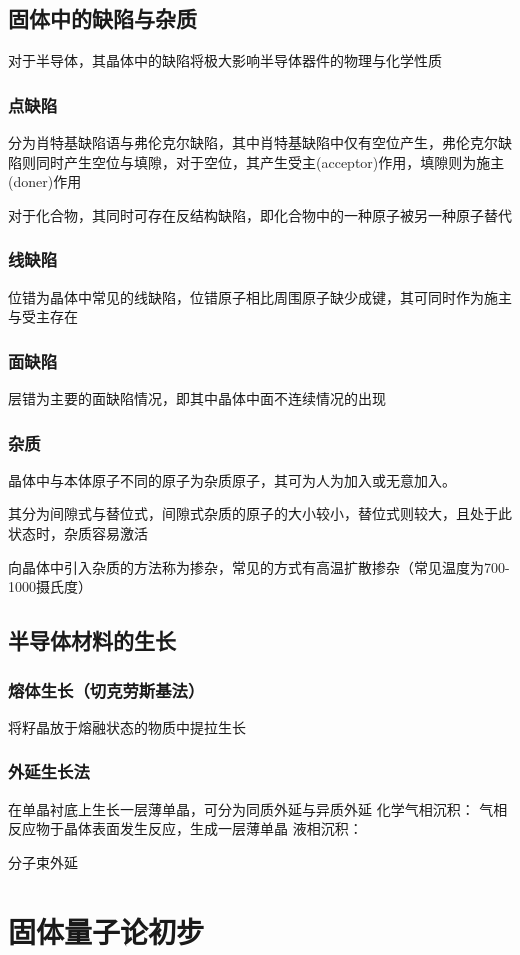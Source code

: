 \documentclass[12pt]{ctexart}
\begin{document}
\subsection{固体中的缺陷与杂质}
对于半导体，其晶体中的缺陷将极大影响半导体器件的物理与化学性质
\subsubsection{点缺陷}
分为肖特基缺陷语与弗伦克尔缺陷，其中肖特基缺陷中仅有空位产生，弗伦克尔缺陷则同时产生空位与填隙，对于空位，其产生受主(acceptor)作用，填隙则为施主(doner)作用

对于化合物，其同时可存在反结构缺陷，即化合物中的一种原子被另一种原子替代

\subsubsection{线缺陷}
位错为晶体中常见的线缺陷，位错原子相比周围原子缺少成键，其可同时作为施主与受主存在
\subsubsection{面缺陷}
层错为主要的面缺陷情况，即其中晶体中面不连续情况的出现
\subsubsection{杂质}
晶体中与本体原子不同的原子为杂质原子，其可为人为加入或无意加入。

其分为间隙式与替位式，间隙式杂质的原子的大小较小，替位式则较大，且处于此状态时，杂质容易激活

向晶体中引入杂质的方法称为掺杂，常见的方式有高温扩散掺杂（常见温度为700-1000摄氏度）
\subsection{半导体材料的生长}
\subsubsection{熔体生长（切克劳斯基法）}
将籽晶放于熔融状态的物质中提拉生长
\subsubsection{外延生长法}
在单晶衬底上生长一层薄单晶，可分为同质外延与异质外延
化学气相沉积：
气相反应物于晶体表面发生反应，生成一层薄单晶
液相沉积：

分子束外延
\section{固体量子论初步}
\end{document}

